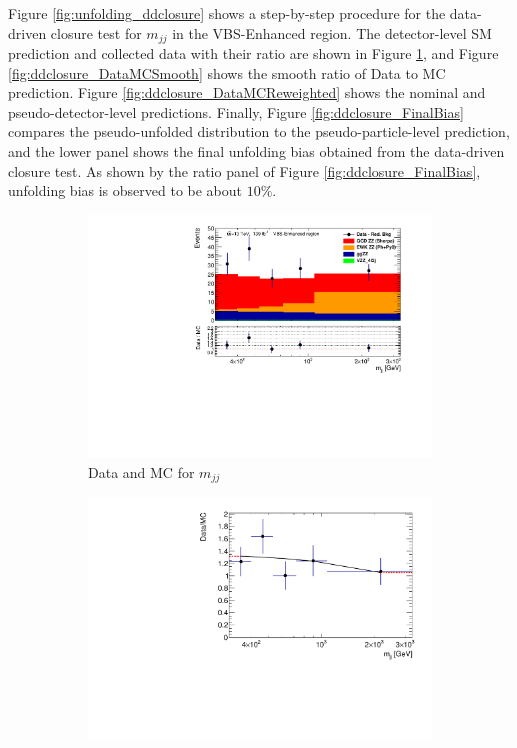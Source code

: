 Figure \ref{fig:unfolding_ddclosure} shows a step-by-step procedure for the data-driven closure test for $m_{jj}$ in the VBS-Enhanced region. The detector-level SM prediction and collected data with their ratio are shown in Figure \ref{fig:ddclosure_DataMC}, and Figure \ref{fig:ddclosure_DataMCSmooth} shows the smooth ratio of Data to MC prediction. Figure \ref{fig:ddclosure_DataMCReweighted} shows the nominal and pseudo-detector-level predictions. Finally, Figure \ref{fig:ddclosure_FinalBias} compares the pseudo-unfolded distribution to the pseudo-particle-level prediction, and the lower panel shows the final unfolding bias obtained from the data-driven closure test. As shown by the ratio panel of Figure \ref{fig:ddclosure_FinalBias}, unfolding bias is observed to be about $10\%$. 
\begin{figure}[htb]
    \centering
    \begin{subfigure}{.49\textwidth}
        \centering
        \includegraphics[width=.9\linewidth]{figures/Analysis/Unfolding/DDClosure_VBS_Enhanced_Ratio.pdf}
        \caption{ Data and MC for $m_{jj}$ \label{fig:ddclosure_DataMC}}
    \end{subfigure}
    \begin{subfigure}{.49\textwidth}
        \centering
        \includegraphics[width=.9\linewidth]{figures/Analysis/Unfolding/DDClosure_VBS_Enhanced_SmoothRatio.pdf}

\end{subfigure}
\end{figure}
